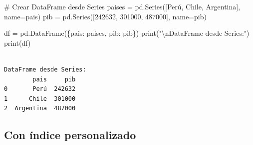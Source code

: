 \documentclass[
  doc,
  floatsintext,
  longtable,
  a4paper,
  nolmodern,
  notxfonts,
  notimes,
  12pt,
  colorlinks=true,linkcolor=blue,citecolor=blue,urlcolor=blue]{apa7}
\newenvironment{Shaded}{\begin{snugshade}}{\end{snugshade}}
\newcommand{\BuiltInTok}[1]{\textcolor[rgb]{0.00,0.23,0.31}{#1}}
\newcommand{\CharTok}[1]{\textcolor[rgb]{0.13,0.47,0.30}{#1}}
\newcommand{\CommentTok}[1]{\textcolor[rgb]{0.37,0.37,0.37}{#1}}
\newcommand{\DecValTok}[1]{\textcolor[rgb]{0.68,0.00,0.00}{#1}}
\newcommand{\NormalTok}[1]{\textcolor[rgb]{0.00,0.23,0.31}{#1}}
\newcommand{\OperatorTok}[1]{\textcolor[rgb]{0.37,0.37,0.37}{#1}}
\newcommand{\StringTok}[1]{\textcolor[rgb]{0.13,0.47,0.30}{#1}}
\begin{document}
\begin{Shaded}
\begin{Highlighting}[]
\CommentTok{\# Crear DataFrame desde Series}
\NormalTok{paises }\OperatorTok{=}\NormalTok{ pd.Series([}\StringTok{\textquotesingle{}Perú\textquotesingle{}}\NormalTok{, }\StringTok{\textquotesingle{}Chile\textquotesingle{}}\NormalTok{, }\StringTok{\textquotesingle{}Argentina\textquotesingle{}}\NormalTok{], name}\OperatorTok{=}\StringTok{\textquotesingle{}pais\textquotesingle{}}\NormalTok{)}
\NormalTok{pib }\OperatorTok{=}\NormalTok{ pd.Series([}\DecValTok{242632}\NormalTok{, }\DecValTok{301000}\NormalTok{, }\DecValTok{487000}\NormalTok{], name}\OperatorTok{=}\StringTok{\textquotesingle{}pib\textquotesingle{}}\NormalTok{)}

\NormalTok{df }\OperatorTok{=}\NormalTok{ pd.DataFrame(\{}\StringTok{\textquotesingle{}pais\textquotesingle{}}\NormalTok{: paises, }\StringTok{\textquotesingle{}pib\textquotesingle{}}\NormalTok{: pib\})}
\BuiltInTok{print}\NormalTok{(}\StringTok{"}\CharTok{\textbackslash{}n}\StringTok{DataFrame desde Series:"}\NormalTok{)}
\BuiltInTok{print}\NormalTok{(df)}
\end{Highlighting}
\end{Shaded}

\begin{verbatim}

DataFrame desde Series:
        pais     pib
0       Perú  242632
1      Chile  301000
2  Argentina  487000
\end{verbatim}

\subsection{Con índice personalizado}\label{con-uxedndice-personalizado}
\end{document}
